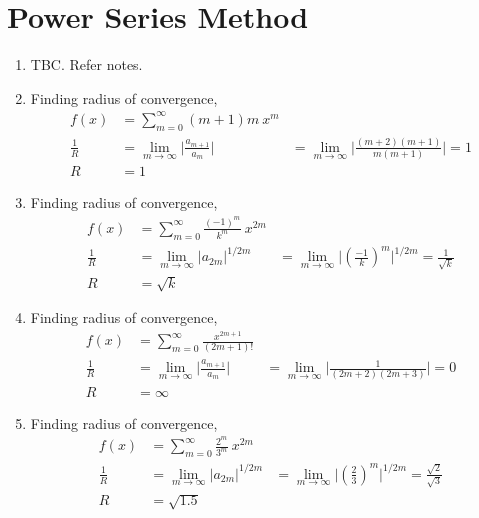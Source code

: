 \section{Power Series Method}

\begin{enumerate}
    \item TBC. Refer notes.
    \item Finding radius of convergence,
          \begin{align}
              f(x)                           & = \sum_{m = 0}^{\infty} (m+1)m\ x^{m} \\
              \frac{1}{R}                    & = \lim_{m \rightarrow \infty}
              \Big| \frac{a_{m+1}}{a_m}\Big| & = \lim_{m \rightarrow \infty}
              \Big|\frac{(m+2)(m+1)}{m(m+1)}\Big| = 1                                \\
              R                              & = 1
          \end{align}

    \item Finding radius of convergence,
          \begin{align}
              f(x)            & = \sum_{m = 0}^{\infty}
              \frac{(-1)^m}{k^m}\ x^{2m}                      \\
              \frac{1}{R}     & = \lim_{m \rightarrow \infty}
              |a_{2m}|^{1/2m} & = \lim_{m \rightarrow \infty}
              \Bigg|\left( \frac{-1}{k} \right)^{m}\Bigg|^{1/2m}
              = \frac{1}{\sqrt{k}}                            \\
              R               & = \sqrt{k}
          \end{align}

    \item Finding radius of convergence,
          \begin{align}
              f(x)        & = \sum_{m = 0}^{\infty}
              \frac{x^{2m + 1}}{(2m + 1)!}                \\
              \frac{1}{R} & = \lim_{m \rightarrow \infty}
              \Bigg| \frac{a_{m+1}}{a_m} \Bigg|
                          & = \lim_{m \rightarrow \infty}
              \Bigg| \frac{1}{(2m+2)(2m+3)} \Bigg| = 0    \\
              R           & = \infty
          \end{align}

    \item Finding radius of convergence,
          \begin{align}
              f(x)            & = \sum_{m = 0}^{\infty}
              \frac{2^m}{3^m}\ x^{2m}                         \\
              \frac{1}{R}     & = \lim_{m \rightarrow \infty}
              |a_{2m}|^{1/2m} & = \lim_{m \rightarrow \infty}
              \Bigg|\left( \frac{2}{3} \right)^{m}\Bigg|^{1/2m}
              = \frac{\sqrt{2}}{\sqrt{3}}                     \\
              R               & = \sqrt{1.5}
          \end{align}


\end{enumerate}
